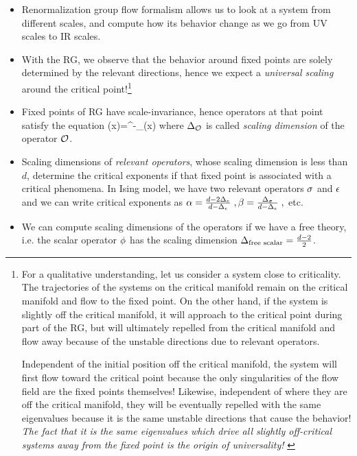 \documentclass[12pt]{article}
\numberwithin{equation}{section}
\begin{document}
\begin{itemize}
	
	\item Renormalization group flow formalism allows us to look at a system from different scales, and compute how its behavior change as we go from UV scales to IR scales. 
	
	\item With the RG, we observe that the behavior around fixed points are solely determined by the relevant directions, hence we expect a \emph{universal scaling} around the critical point!\footnote{For a qualitative understanding, let us consider a system close to criticality. The trajectories of the systems on the critical manifold remain on the critical manifold and flow to the fixed point. On the other hand, if the system is slightly off the critical manifold, it will approach to the critical point during part of the RG, but will ultimately repelled from the critical manifold and flow away because of the unstable directions due to relevant operators.
		
		Independent of the initial position off the critical manifold, the system will first flow toward the critical point because the only singularities of the flow field are the fixed points themselves! Likewise, independent of where they are off the critical manifold, they will be eventually repelled with the same eigenvalues because it is the same unstable directions that cause the behavior! \emph{The fact that it is the same eigenvalues which drive all slightly off-critical systems away from the fixed point is the origin of  universality!} \cite{Goldenfeld:1992qy}}
	
	\item Fixed points of RG have scale-invariance, hence operators at that point satisfy the equation
\be
\cO(\lambda x)=\lambda^{-\De_{\cO}}\cO(x) 
\ee
where $\Delta_{\mathcal{O}}$ is called \emph{scaling dimension} of the operator $\mathcal{O}$.
\item Scaling dimensions of \emph{relevant operators}, whose scaling dimension is less than $d$, determine the critical exponents if that fixed point is associated with a critical phenomena. In Ising model, we have two relevant operators $\sigma$ and $\epsilon$ and we can write critical exponents as $\alpha=\frac{d-2\Delta_e}{d-\Delta_\epsilon}\;,
\beta=\frac{\Delta_\sigma}{d-\Delta_\epsilon}\;,$ etc.

\item We can compute scaling dimensions of the operators if we have a free theory, i.e. the  scalar operator $\phi$ has the scaling dimension $\Delta_{\text{free scalar}}=\frac{d-2}{2}$.


\end{itemize}
\end{document}

